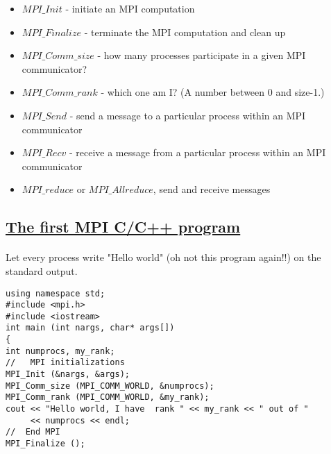 \begin{itemize}
\item $MPI\_Init$ - initiate an MPI computation

\item $MPI\_Finalize$ - terminate the MPI computation and clean up

\item $MPI\_Comm\_size$ - how many processes participate in a given MPI communicator?

\item $MPI\_Comm\_rank$ - which one am I? (A number between 0 and size-1.)

\item $MPI\_Send$ - send a message to a particular process within an MPI communicator

\item $MPI\_Recv$ - receive a message from a particular process within an MPI communicator

\item $MPI\_reduce$  or $MPI\_Allreduce$, send and receive messages
\end{itemize}

\noindent



\subsection*{\href{{https://github.com/CompPhysics/ComputationalPhysics2/blob/gh-pages/doc/Programs/LecturePrograms/programs/MPI/chapter07/program2.cpp}}{The first MPI C/C++ program}}

\paragraph{}

Let every process write "Hello world" (oh not this program again!!) on the standard output. 















\begin{verbatim}
using namespace std;
#include <mpi.h>
#include <iostream>
int main (int nargs, char* args[])
{
int numprocs, my_rank;
//   MPI initializations
MPI_Init (&nargs, &args);
MPI_Comm_size (MPI_COMM_WORLD, &numprocs);
MPI_Comm_rank (MPI_COMM_WORLD, &my_rank);
cout << "Hello world, I have  rank " << my_rank << " out of " 
     << numprocs << endl;
//  End MPI
MPI_Finalize ();

\end{verbatim}



